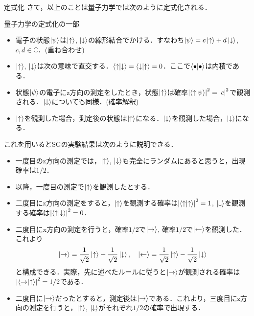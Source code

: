 \documentclass[dvipdfmx]{beamer}
\theoremstyle{break}
\newcommand{\up}{\ket{\uparrow}}
\newcommand{\down}{\ket{\downarrow}}
\newcommand{\C}{\mathbb{C}}
\begin{document}
\begin{frame}[allowframebreaks]{定式化}
		さて，以上のことは量子力学では次のように定式化される．

		\begin{block}{量子力学の定式化の一部}
				\begin{itemize}
						\item 電子の状態$\ket{\psi}$は$\up$, $\down$の線形結合でかける．すなわち$\ket{\psi}=c\up + d\down$, $c, d\in \C$．(重ね合わせ)
						\item $\up$, $\down$は次の意味で直交する．$\braket{\uparrow}{\downarrow} = \braket{\downarrow}{\uparrow} = 0$．ここで$\braket{\bullet}{\bullet}$は内積である．
						\item 状態$\ket{\psi}$の電子にz方向の測定をしたとき，状態$\up$は確率$\abs{\braket{\uparrow}{\psi}}^2=\abs{c}^2$で観測される．$\down$についても同様．(確率解釈)
						\item $\up$を観測した場合，測定後の状態は$\up$になる．$\down$を観測した場合，$\down$になる．
				\end{itemize}
		\end{block}
		\newpage
		これを用いるとSGの実験結果は次のように説明できる．

		\begin{itemize}
				\item 一度目のz方向の測定では，$\up$, $\down$も完全にランダムにあると思うと，出現確率は$1/2$．
				\item 以降，一度目の測定で$\up$を観測したとする．
				\item 二度目にz方向の測定をすると，$\up$を観測する確率は$\abs{\braket{\uparrow}{\uparrow}}^2 = 1$, $\down$を観測する確率は$\abs{\braket{\uparrow}{\downarrow}}^2 = 0$．
				\item 二度目にx方向の測定を行うと，確率$1/2$で$\ket{\rightarrow}$, 確率$1/2$で$\ket{\leftarrow}$を観測した．これより
						\begin{align*}
								\ket{\rightarrow} = \frac{1}{\sqrt{2}}\up + \frac{1}{\sqrt{2}}\down,\quad
								\ket{\leftarrow} = \frac{1}{\sqrt{2}}\up - \frac{1}{\sqrt{2}}\down
						\end{align*}
						と構成できる．実際，先に述べたルールに従うと$\ket{\rightarrow}$が観測される確率は$\abs{\braket{\rightarrow}{\uparrow}}^2 = 1/2$である．
				\item 二度目に$\ket{\rightarrow}$だったとすると，測定後は$\ket{\rightarrow}$である．これより，三度目にz方向の測定を行うと，$\up$, $\down$がそれぞれ$1/2$の確率で出現する．
		\end{itemize}
\end{frame}
\end{document}
